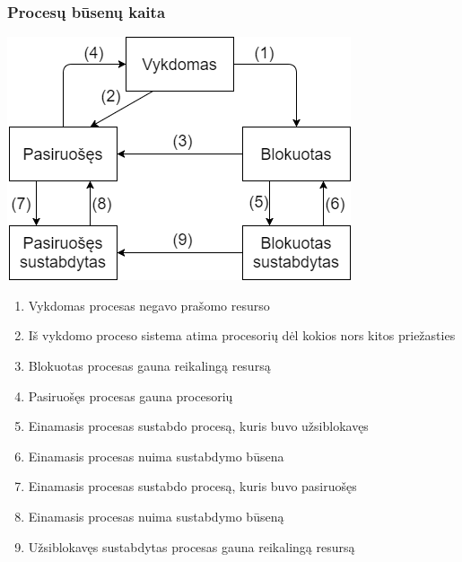 \documentclass{scrartcl}
\begin{document}
      \subsubsection{Procesų būsenų kaita}
        \begin{center}
          \includegraphics[scale=0.7]{Process_state}
        \end{center}
        \begin{enumerate}
          \item Vykdomas procesas negavo prašomo resurso
          \item Iš vykdomo proceso sistema atima procesorių dėl kokios nors kitos priežasties
          \item Blokuotas procesas gauna reikalingą resursą
          \item Pasiruošęs procesas gauna procesorių
          \item Einamasis procesas sustabdo procesą, kuris buvo užsiblokavęs
          \item Einamasis procesas nuima sustabdymo būsena
          \item Einamasis procesas sustabdo procesą, kuris buvo pasiruošęs
          \item Einamasis procesas nuima sustabdymo būseną
          \item Užsiblokavęs sustabdytas procesas gauna reikalingą resursą
        \end{enumerate}
\end{document}
